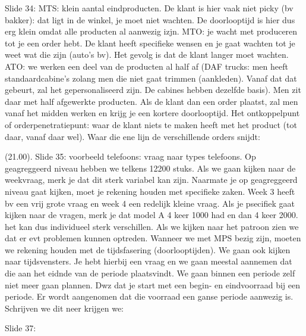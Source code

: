 \documentclass[10pt,a4paper]{report}
\begin{document}
Slide 34: MTS: klein aantal eindproducten. De klant is hier vaak niet picky (bv bakker): dat ligt in de winkel, je moet niet wachten. De doorlooptijd is hier dus erg klein omdat alle producten al aanwezig izjn. MTO: je wacht met produceren tot je een order hebt. De klant heeft specifieke wensen en je gaat wachten tot je weet wat die zijn (auto's bv). Het gevolg is dat de klant langer moet wachten. ATO: we werken een deel van de producten al half af (DAF trucks: men heeft standaardcabine's zolang men die niet gaat trimmen (aankleden). Vanaf dat dat gebeurt, zal het gepersonaliseerd zijn. De cabines hebben dezelfde basis). Men zit daar met half afgewerkte producten. Als de klant dan een order plaatst, zal men vanaf het midden werken en krijg je een kortere doorlooptijd.
Het ontkoppelpunt of orderpenetratiepunt: waar de klant niets te maken heeft met het product (tot daar, vanaf daar wel). Waar die ene lijn de verschillende orders snijdt:


(21.00).
Slide 35: voorbeeld telefoons: vraag naar types telefoons. Op geagreggeerd niveau hebben we telkens 12200 stuks. Als we gaan kijken naar de weekvraag, merk je dat dit sterk variabel kan zijn. Naarmate je op geagreggeerd niveau gaat kijken, moet je rekening houden met specifieke zaken. Week 3 heeft bv een vrij grote vraag en week 4 een redelijk kleine vraag. Als je psecifiek gaat kijken naar de vragen, merk je dat model A 4 keer 1000 had en dan 4 keer 2000. het kan dus individueel sterk verschillen.
Als we kijken naar het patroon zien we dat er evt problemen kunnen optreden.
Wanneer we met MPS bezig zijn, moeten we rekening houden met de tijdsfasering (doorlooptijden). We gaan ook kijken naar tijdsvensters. Je hebt hierbij een vraag en we gaan meestal aannemen dat die aan het eidnde van de periode plaatsvindt. We gaan binnen een periode zelf niet meer gaan plannen. Dwz dat je start met een begin- en eindvoorraad bij een periode. Er wordt aangenomen dat die voorraad een ganse periode aanwezig is. Schrijven we dit neer krijgen we:


















Slide 37: 


\end{document}
